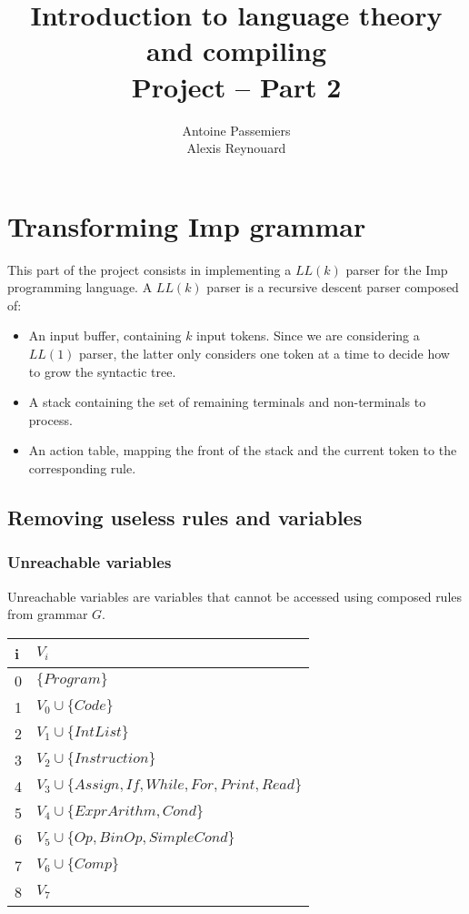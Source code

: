 \documentclass[12pt]{report}
\title{Introduction to language theory and compiling \\ Project -- Part 2}
\author{Antoine Passemiers \\ Alexis Reynouard}
\begin{document}
\maketitle
\tableofcontents
\thispagestyle{empty}
\pagebreak
\setcounter{page}{1}
\clearpage

\chapter{Transforming Imp grammar}

This part of the project consists in implementing a $LL(k)$ parser for the Imp programming language. A $LL(k)$ parser is a recursive descent parser composed of:

\begin{itemize}
\item An input buffer, containing $k$ input tokens. Since we are considering a $LL(1)$ parser, the latter only considers one token at a time to decide how to 
grow the syntactic tree.
\item A stack containing the set of remaining terminals and non-terminals to process.
\item An action table, mapping the front of the stack and the current token to the corresponding rule.
\end{itemize}

\section{Removing useless rules and variables}

\subsection{Unreachable variables}

Unreachable variables are variables that cannot be accessed using composed rules from grammar $G$.

\begin{tabular}{|l p{35em}|} \hline
 i & $V_i$ \\ \hline
0 & $\{Program\}$ \\ \hline
1 & $V_0 \cup \{Code\}$ \\ \hline
2 & $V_1 \cup \{IntList\}$ \\ \hline
3 & $V_2 \cup \{Instruction\}$ \\ \hline
4 & $V_3 \cup \{Assign, If, While, For, Print, Read\}$ \\ \hline
5 & $V_4 \cup \{ExprArithm, Cond\}$ \\ \hline
6 & $V_5 \cup \{Op, BinOp, SimpleCond\}$ \\ \hline
7 & $V_6 \cup \{Comp\}$ \\ \hline
8 & $V_7$ \\ \hline
\end{tabular}
\end{document}
